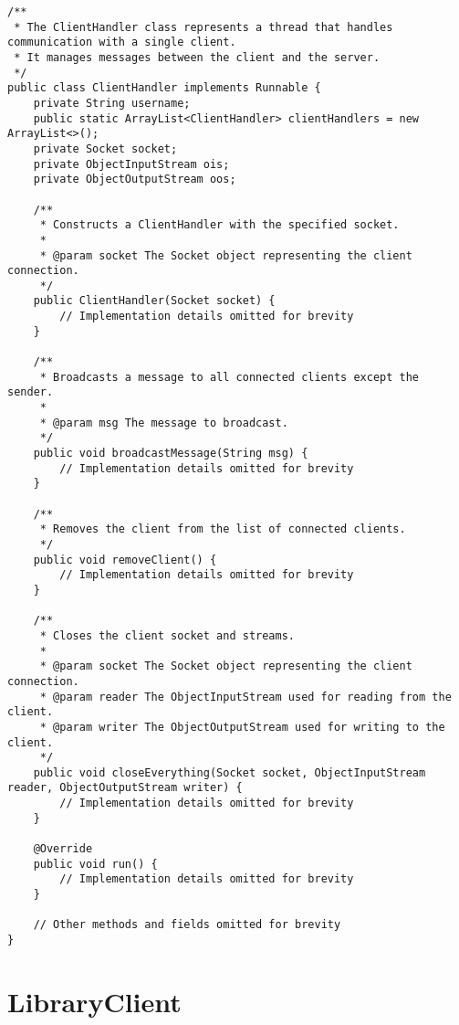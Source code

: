 \documentclass{article}
\begin{document}
\begin{lstlisting}[caption={ClientHandler.java}]
/**
 * The ClientHandler class represents a thread that handles communication with a single client.
 * It manages messages between the client and the server.
 */
public class ClientHandler implements Runnable {
    private String username;
    public static ArrayList<ClientHandler> clientHandlers = new ArrayList<>();
    private Socket socket;
    private ObjectInputStream ois;
    private ObjectOutputStream oos;

    /**
     * Constructs a ClientHandler with the specified socket.
     *
     * @param socket The Socket object representing the client connection.
     */
    public ClientHandler(Socket socket) {
        // Implementation details omitted for brevity
    }

    /**
     * Broadcasts a message to all connected clients except the sender.
     *
     * @param msg The message to broadcast.
     */
    public void broadcastMessage(String msg) {
        // Implementation details omitted for brevity
    }

    /**
     * Removes the client from the list of connected clients.
     */
    public void removeClient() {
        // Implementation details omitted for brevity
    }

    /**
     * Closes the client socket and streams.
     *
     * @param socket The Socket object representing the client connection.
     * @param reader The ObjectInputStream used for reading from the client.
     * @param writer The ObjectOutputStream used for writing to the client.
     */
    public void closeEverything(Socket socket, ObjectInputStream reader, ObjectOutputStream writer) {
        // Implementation details omitted for brevity
    }

    @Override
    public void run() {
        // Implementation details omitted for brevity
    }

    // Other methods and fields omitted for brevity
}
\end{lstlisting}

\section{LibraryClient}
\end{document}
